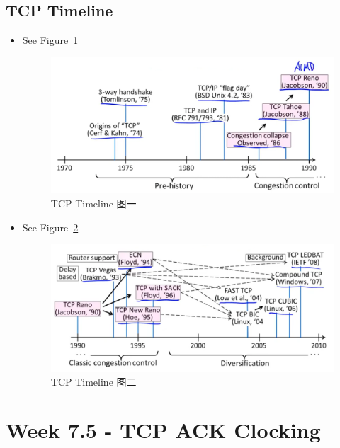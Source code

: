 \documentclass[12pt]{ctexart}   %
\begin{document}
	\subsection{TCP Timeline}
	\begin{itemize}
		\item See Figure~\ref{fig:7-4-2}
		  
		 \begin{figure}[h!] %
		\centering
		 \includegraphics[scale=0.7]{images/7-4-2}
		\caption{ TCP Timeline 图一}
		 \label{fig:7-4-2}
		 \end{figure}
		 
		 \item See Figure~\ref{fig:7-4-3}
		  
		 \begin{figure}[h!] %
		\centering
		 \includegraphics[scale=0.7]{images/7-4-3}
		\caption{ TCP Timeline 图二}
		 \label{fig:7-4-3}
		 \end{figure}
	\end{itemize}
	
\section{Week 7.5 - TCP ACK Clocking}
\end{document}
